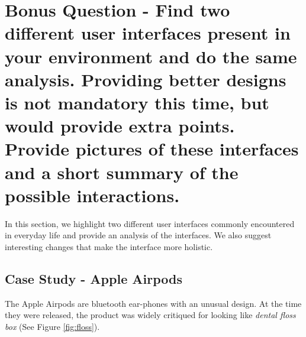 \documentclass[10pt]{scrartcl}
\begin{document}
\section{Bonus Question - Find two different user interfaces present in your environment and do the same analysis. Providing better designs is not mandatory this time, but would provide extra points. Provide pictures of these interfaces and a short summary of the possible interactions.}

In this section, we highlight two different user interfaces commonly encountered in everyday life and provide an analysis of the interfaces. We also suggest interesting changes that make the interface more holistic.

\subsection{Case Study - Apple Airpods}The Apple Airpods are bluetooth ear-phones with an unusual design. At the time they were released, the product was widely critiqued for looking like \emph{dental floss box} (See Figure \ref{fig:floss}).
\end{document}
